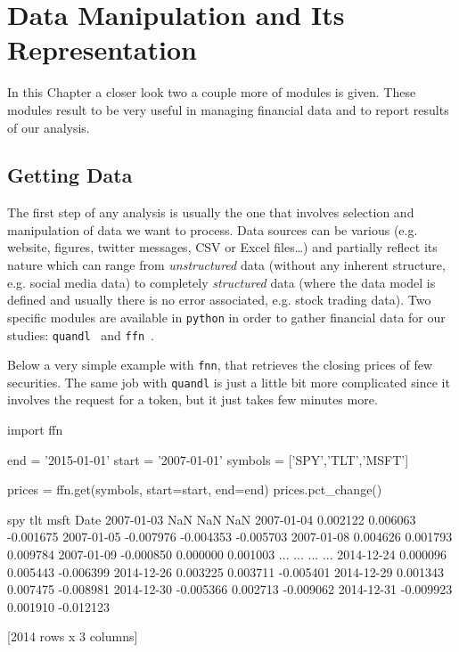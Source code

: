 \chapter{Data Manipulation and Its Representation}
\label{sec:datamanip}

In this Chapter a closer look two a couple more of modules is given. These modules result to be very useful in managing financial data and to report results of our analysis.

\section{Getting Data}\label{getting-data}

The first step of any analysis is usually the one that involves selection and manipulation of data we want to process. Data sources can be various (e.g. website, figures, twitter messages, CSV or Excel files\ldots) and partially reflect its nature which can range from \emph{unstructured} data (without any inherent structure, e.g. social media data) to completely \emph{structured} data (where the data model is defined and usually there is no error associated, e.g. stock trading data).
Two specific modules are available in \texttt{python} in order to gather financial data for our studies: \texttt{quandl}~\cite{quandl} and \texttt{ffn}~\cite{ffn}.

Below a very simple example with \texttt{fnn}, that retrieves the closing prices of few securities. The same job with \texttt{quandl} is just a little bit more complicated since it involves the request for a token, but it just takes few minutes more.  

\begin{ipython}
import ffn

end = '2015-01-01'
start = '2007-01-01'
symbols = ['SPY','TLT','MSFT']

prices = ffn.get(symbols, start=start, end=end)
prices.pct_change()
\end{ipython}
\begin{ioutput}
                 spy       tlt      msft
Date
2007-01-03       NaN       NaN       NaN
2007-01-04  0.002122  0.006063 -0.001675
2007-01-05 -0.007976 -0.004353 -0.005703
2007-01-08  0.004626  0.001793  0.009784
2007-01-09 -0.000850  0.000000  0.001003
...        ...       ...       ...
2014-12-24  0.000096  0.005443 -0.006399
2014-12-26  0.003225  0.003711 -0.005401
2014-12-29  0.001343  0.007475 -0.008981
2014-12-30 -0.005366  0.002713 -0.009062
2014-12-31 -0.009923  0.001910 -0.012123
	
[2014 rows x 3 columns]
\end{ioutput}

